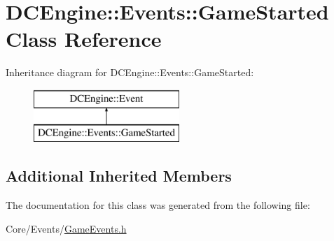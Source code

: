 \hypertarget{classDCEngine_1_1Events_1_1GameStarted}{\section{D\-C\-Engine\-:\-:Events\-:\-:Game\-Started Class Reference}
\label{classDCEngine_1_1Events_1_1GameStarted}
}
Inheritance diagram for D\-C\-Engine\-:\-:Events\-:\-:Game\-Started\-:\begin{figure}[H]
\begin{center}
\leavevmode
\includegraphics[height=2.000000cm]{classDCEngine_1_1Events_1_1GameStarted}
\end{center}
\end{figure}
\subsection*{Additional Inherited Members}


The documentation for this class was generated from the following file\-:\begin{DoxyCompactItemize}
\item 
Core/\-Events/\hyperlink{GameEvents_8h}{Game\-Events.\-h}\end{DoxyCompactItemize}
